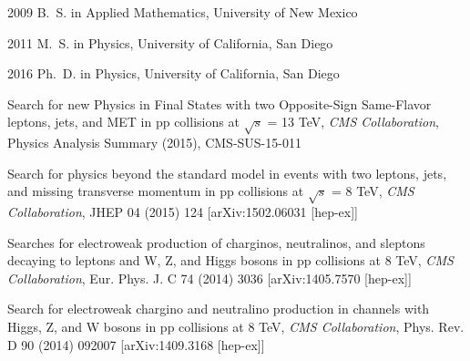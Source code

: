 \begin{frontmatter}
\begin{vitapage}                                                               
\begin{vita}                                                                   
  \item[2009] B.~S. in Applied Mathematics, University of New Mexico
  \item[2011] M.~S. in Physics, University of California, San Diego
  \item[2016] Ph.~D. in Physics, University of California, San Diego       
\end{vita}                                                                     
\begin{publications}                                                           
\item Search for new Physics in Final States with two Opposite-Sign Same-Flavor leptons, jets, and MET in pp collisions at $\sqrt{s}$ = 13 TeV, {\it CMS Collaboration}, Physics Analysis Summary (2015), CMS-SUS-15-011 
\item Search for physics beyond the standard model in events with two leptons, jets, and missing transverse momentum in pp collisions at $\sqrt{s}$ = 8 TeV, {\it CMS Collaboration}, JHEP 04 (2015) 124 [arXiv:1502.06031 [hep-ex]]
\item Searches for electroweak production of charginos, neutralinos, and sleptons decaying to leptons and W, Z, and Higgs bosons in pp collisions at 8 TeV, {\it CMS Collaboration}, Eur. Phys. J. C 74 (2014) 3036 [arXiv:1405.7570 [hep-ex]]
\item Search for electroweak chargino and neutralino production in channels with Higgs, Z, and W bosons in pp collisions at 8 TeV, {\it CMS Collaboration}, Phys. Rev. D 90 (2014) 092007 [arXiv:1409.3168 [hep-ex]]

\end{publications}                                                             
\end{vitapage}                                                                 
                                                                               


\end{frontmatter}
